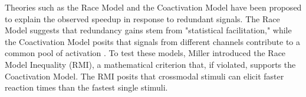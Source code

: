 \documentclass[12pt,oneside,openright]{report}
\begin{document}
Theories such as the Race Model and the Coactivation Model have been proposed to explain the observed speedup in response to redundant signals. The Race Model suggests that redundancy gains stem from "statistical facilitation," while the Coactivation Model posits that signals from different channels contribute to a common pool of activation \textcite{MILLER1982247}. To test these models, Miller introduced the Race Model Inequality (RMI), a mathematical criterion that, if violated, supports the Coactivation Model. The RMI posits that crossmodal stimuli can elicit faster reaction times than the fastest single stimuli.




\end{document}
